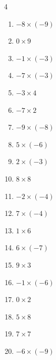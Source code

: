 \begin{multicols}{4}
\begin{enumerate}
  \item $-8\times (-9)$
        \phantom{$=72$}

  \item $0\times 9$
        \phantom{$=0$}

  \item $-1\times (-3)$
        \phantom{$=3$}

  \item $-7\times (-3)$
        \phantom{$=21$}

  \item $-3\times 4$
        \phantom{$=-12$}

  \item $-7\times 2$
        \phantom{$=-14$}

  \item $-9\times (-8)$
        \phantom{$=72$}

  \item $5\times (-6)$
        \phantom{$=-30$}

  \item $2\times (-3)$
        \phantom{$=-6$}

  \item $8\times 8$
        \phantom{$=64$}

  \item $-2\times (-4)$
        \phantom{$=8$}

  \item $7\times (-4)$
        \phantom{$=-28$}

  \item $1\times 6$
        \phantom{$=6$}

  \item $6\times (-7)$
        \phantom{$=-42$}

  \item $9\times 3$
        \phantom{$=27$}

\columnbreak %

  \item $-1\times (-6)$
        \phantom{$=6$}

  \item $0\times 2$
        \phantom{$=0$}

  \item $5\times 8$
        \phantom{$=40$}

  \item $7\times 7$
        \phantom{$=49$}

  \item $-6\times (-9)$
        \phantom{$=54$}


\end{enumerate}
\end{multicols}
